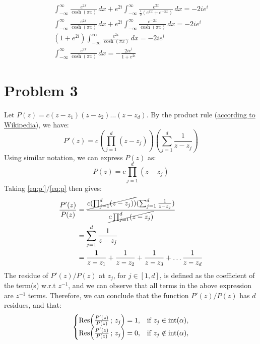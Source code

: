 \documentclass[letterpaper, titlepage, DIV=14]{scrartcl}
\begin{document}
\begin{enumerate}[i)]
\begin{gather*}
      \int_{-\infty}^{\infty} \frac{e^{2x}}{\cosh(\pi x)} \, dx + e^{2i}\int_{-\infty}^{\infty} \frac{e^{2x}}{\frac{1}{2}(e^{\pi x}+e^{-\pi x})} \, dx = -2ie^{i} \\
      \int_{-\infty}^{\infty} \frac{e^{2x}}{\cosh(\pi x)} \, dx + e^{2i}\int_{-\infty}^{\infty} \frac{e^{-2x}}{\cosh(\pi x)} \, dx = -2ie^{i} \\
      (1+e^{2i})\int_{-\infty}^{\infty} \frac{e^{2x}}{\cosh(\pi x)} \, dx = -2ie^{i} \\
      \int_{-\infty}^{\infty} \frac{e^{2x}}{\cosh(\pi x)} \, dx = -\frac{2ie^{i}}{1+e^{2i}} 
    \end{gather*}
    \end{enumerate}

    \section*{Problem 3}
    Let $P(z)=c(z-z_{1})(z-z_{2})\ldots(z-z_{d})$. By the product rule (\href{https://en.wikipedia.org/wiki/Product_rule}{according to Wikipedia}), we have:
    \begin{equation}
      P'(z) = c (\prod_{j=1}^{d}(z-z_{j}))(\sum_{j=1}^{d}\frac{1}{z-z_{j}}) \label{eq:p'}
    \end{equation}
    Using similar notation, we can express $P(z)$ as:
    \begin{equation}
      P(z) = c\prod_{j=1}^{d}(z-z_{j}) \label{eq:p}
    \end{equation}
    Taking \eqref{eq:p'}$/$\eqref{eq:p} then gives:
    \begin{align*}
      \frac{P'(z)}{P(z)} &= \frac{\cancel{c (\prod_{j=1}^{d}(z-z_{j}))}(\sum_{j=1}^{d}\frac{1}{z-z_{j}})}{\cancel{c\prod_{j=1}^{d}(z-z_{j})}} \\
        &= \sum_{j=1}^{d}\frac{1}{z-z_{j}} \\
        &= \frac{1}{z-z_{1}} + \frac{1}{z-z_{2}} + \frac{1}{z-z_{3}} + \ldots \frac{1}{z-z_{d}}
    \end{align*}
    The residue of $P'(z)/P(z)$ at $z_{j}$, for $j\in[1,d]$, is defined as the coefficient of the term(s) w.r.t $z^{-1}$, and we can observe that all terms in the above expression are $z^{-1}$ terms. Therefore, we can conclude that the function $P'(z)/P(z)$ has $d$ residues, and that:
    \begin{equation}
      \begin{cases}
        \Res(\frac{P'(z)}{P(z)} \, ; \, z_{j}) = 1, & \text{if } z_{j}\in\text{int}(\alpha), \\
        \Res(\frac{P'(z)}{P(z)} \, ; \, z_{j}) = 0, & \text{if } z_{j}\notin \text{int}(\alpha),
      \end{cases} \label{eq:p-res}
    \end{equation}
  
\end{document}

